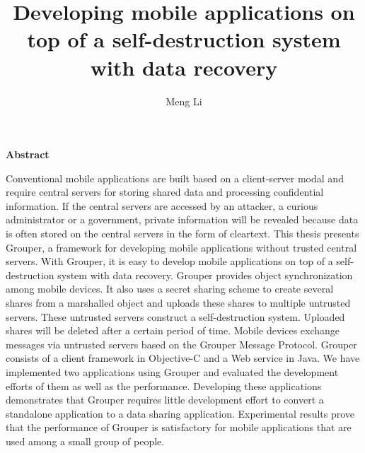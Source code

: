 \documentclass[a4paper,11pt]{report}
\title{Developing mobile applications on top of a self-destruction system with data recovery}
\author{Meng Li}
\begin{document}
		
\maketitle
\thispagestyle{empty}
\newpage

\thispagestyle{empty}
\vspace*{20pt plus 1fil}
\noindent
\begin{center}
{\bf Abstract}
\vspace{5mm}
\end{center}
Conventional mobile applications are built based on a client-server modal and require central servers for storing shared data and processing confidential information.
If the central servers are accessed by an attacker, a curious administrator or a government, private information will be revealed because data is often stored on the central servers in the form of cleartext.
This thesis presents Grouper, a framework for developing mobile applications without trusted central servers.
With Grouper, it is easy to develop mobile applications on top of a self-destruction system with data recovery.
Grouper provides object synchronization among mobile devices.
It also uses a secret sharing scheme to create several shares from a marshalled object and uploads these shares to multiple untrusted servers. 
These untrusted servers construct a self-destruction system. 
Uploaded shares will be deleted after a certain period of time. 
Mobile devices exchange messages via untrusted servers based on the Grouper Message Protocol. 
Grouper consists of a client framework in Objective-C and a Web service in Java.
We have implemented two applications using Grouper and evaluated the development efforts of them as well as the performance. 
Developing these applications demonstrates that Grouper requires little development effort to convert a standalone application to a data sharing application.
Experimental results prove that the performance of Grouper is satisfactory for mobile applications that are used among a small group of people.
\par
\vspace{0pt plus 1fil}
\newpage
\end{document}
